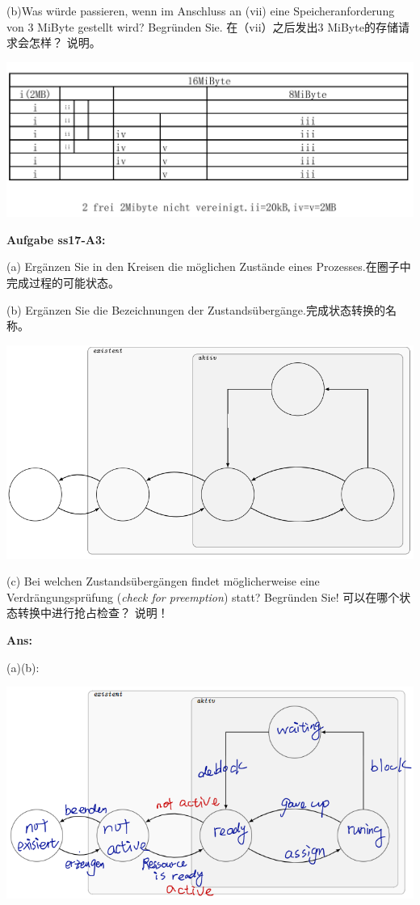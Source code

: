 \documentclass[fleqn]{article}
\begin{document}
(b)Was würde passieren, wenn im Anschluss an (vii) eine Speicheranforderung von 3 MiByte gestellt wird? Begründen Sie.
在（vii）之后发出3 MiByte的存储请求会怎样？ 说明。

\begin{center}
    \includegraphics[scale=0.2]{bild2.png}
\end{center}

\noindent\textbf{Aufgabe ss17-A3:}

(a) Ergänzen Sie in den Kreisen die möglichen Zustände eines Prozesses.在圈子中完成过程的可能状态。

(b) Ergänzen Sie die Bezeichnungen der Zustandsübergänge.完成状态转换的名称。

\begin{center}
    \includegraphics[scale=0.5]{bild1.png}
\end{center}

(c) Bei welchen Zustandsübergängen findet möglicherweise eine Verdrängungsprüfung (\textit{check for preemption}) statt? Begründen Sie!
可以在哪个状态转换中进行抢占检查？ 说明！

\textbf{Ans:}

(a)(b): \begin{center}
    \includegraphics[scale=0.6]{bild4.png}
\end{center}
\end{document}

